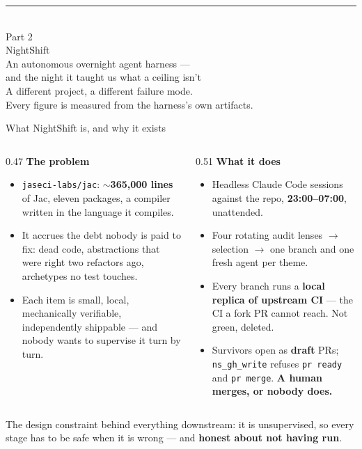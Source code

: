 \documentclass[aspectratio=169,11pt]{beamer}
\newcommand{\good}[1]{\textcolor{jsAccent}{\textbf{#1}}}
\newcommand{\srcnote}[1]{\vfill{\scriptsize\color{jsMute}#1}}
\begin{document}
\begin{frame}[plain]
  \vfill
  \begin{center}
    {\color{jsPrimary}\rule{0.16\textwidth}{2pt}}\\[1.1em]
    {\large\color{jsMute}Part 2}\\[0.4em]
    {\color{jsPrimary}NightShift}\\[0.6em]
    {\large\color{jsInk}An autonomous overnight agent harness ---\\and the night it taught us what a ceiling isn't}\\[1.6em]
    {\footnotesize\color{jsMute}A different project, a different failure mode.\\
     Every figure is measured from the harness's own artifacts.}
  \end{center}
  \vfill
\end{frame}

\begin{frame}{What NightShift is, and why it exists}
  \small
  \begin{columns}[T]
    \begin{column}{0.47\textwidth}
      \textbf{The problem}
      \begin{itemize}
        \item \texttt{jaseci-labs/jac}: $\sim$\textbf{365{,}000 lines} of Jac, eleven packages, a compiler written in the language it compiles.
        \item It accrues the debt nobody is paid to fix: dead code, abstractions that were right two refactors ago, archetypes no test touches.
        \item Each item is small, local, mechanically verifiable, independently shippable --- and nobody wants to supervise it turn by turn.
      \end{itemize}
    \end{column}
    \begin{column}{0.51\textwidth}
      \textbf{What it does}
      \begin{itemize}
        \item Headless Claude Code sessions against the repo, \textbf{23:00--07:00}, unattended.
        \item Four rotating audit lenses $\rightarrow$ selection $\rightarrow$ one branch and one fresh agent per theme.
        \item Every branch runs a \textbf{local replica of upstream CI} --- the CI a fork PR cannot reach. Not green, deleted.
        \item Survivors open as \textbf{draft} PRs; \texttt{ns\_gh\_write} refuses \texttt{pr ready} and \texttt{pr merge}. \good{A human merges, or nobody does.}
      \end{itemize}
    \end{column}
  \end{columns}
  \srcnote{The design constraint behind everything downstream: it is unsupervised, so every stage has to be safe when it is wrong --- and \textbf{honest about not having run}.}
\end{frame}
\end{document}
